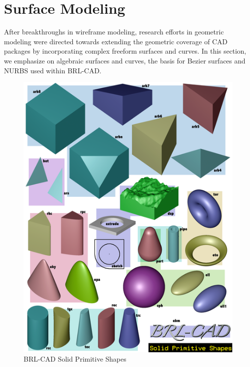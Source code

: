 
\section{Surface Modeling}

After breakthroughs in wireframe modeling, research efforts in geometric modeling were directed 
towards extending the geometric coverage of CAD packages by incorporating complex free­form surfaces
 and curves. In this section, we emphasize on algebraic surfaces and curves, the basis for Bezier 
surfaces and NURBS used within BRL­-CAD.


\begin{figure}[htbp]
\centering
\includegraphics[trim=0.1cm 0.3cm 0.5cm 0.5cm, clip=true, totalheight=0.6\textheight]{Figures/Primitives.png}
\caption[BRL­-CAD Solid Primitive Shapes]{BRL-­CAD Solid Primitive Shapes}
\label{Primitives}
\end{figure}

